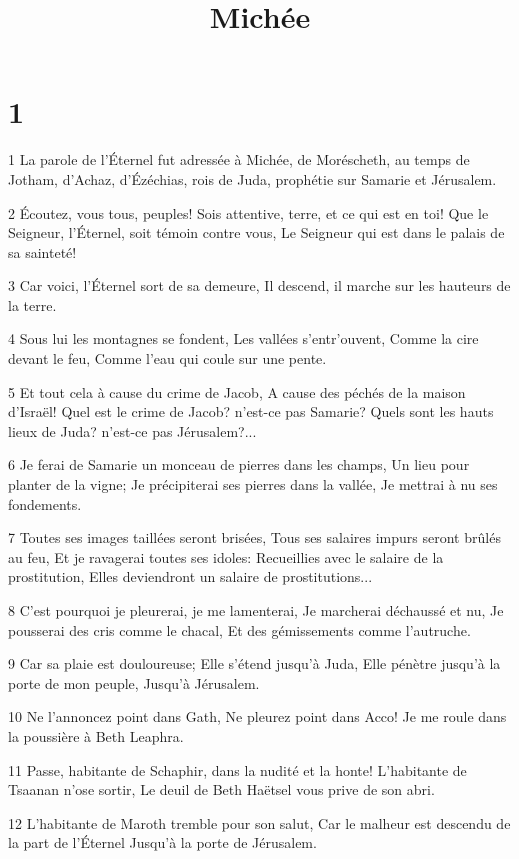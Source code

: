 

\title{Michée}


\chapter{1}

\par 1 La parole de l'Éternel fut adressée à Michée, de Moréscheth, au temps de Jotham, d'Achaz, d'Ézéchias, rois de Juda, prophétie sur Samarie et Jérusalem.
\par 2 Écoutez, vous tous, peuples! Sois attentive, terre, et ce qui est en toi! Que le Seigneur, l'Éternel, soit témoin contre vous, Le Seigneur qui est dans le palais de sa sainteté!
\par 3 Car voici, l'Éternel sort de sa demeure, Il descend, il marche sur les hauteurs de la terre.
\par 4 Sous lui les montagnes se fondent, Les vallées s'entr'ouvent, Comme la cire devant le feu, Comme l'eau qui coule sur une pente.
\par 5 Et tout cela à cause du crime de Jacob, A cause des péchés de la maison d'Israël! Quel est le crime de Jacob? n'est-ce pas Samarie? Quels sont les hauts lieux de Juda? n'est-ce pas Jérusalem?...
\par 6 Je ferai de Samarie un monceau de pierres dans les champs, Un lieu pour planter de la vigne; Je précipiterai ses pierres dans la vallée, Je mettrai à nu ses fondements.
\par 7 Toutes ses images taillées seront brisées, Tous ses salaires impurs seront brûlés au feu, Et je ravagerai toutes ses idoles: Recueillies avec le salaire de la prostitution, Elles deviendront un salaire de prostitutions...
\par 8 C'est pourquoi je pleurerai, je me lamenterai, Je marcherai déchaussé et nu, Je pousserai des cris comme le chacal, Et des gémissements comme l'autruche.
\par 9 Car sa plaie est douloureuse; Elle s'étend jusqu'à Juda, Elle pénètre jusqu'à la porte de mon peuple, Jusqu'à Jérusalem.
\par 10 Ne l'annoncez point dans Gath, Ne pleurez point dans Acco! Je me roule dans la poussière à Beth Leaphra.
\par 11 Passe, habitante de Schaphir, dans la nudité et la honte! L'habitante de Tsaanan n'ose sortir, Le deuil de Beth Haëtsel vous prive de son abri.
\par 12 L'habitante de Maroth tremble pour son salut, Car le malheur est descendu de la part de l'Éternel Jusqu'à la porte de Jérusalem.

